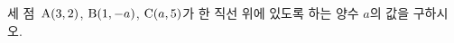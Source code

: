 세 점~$\mathrm{A}(3{,}\mkern3mu\mathopen{}2)$, $\mathrm{B}(1{,}\mkern3mu\mathopen{}-a)$, $\mathrm{C}(a{,}\mkern3mu\mathopen{}5)$가 한 직선 위에 있도록 하는 양수 $a$의 값을 구하시오.
